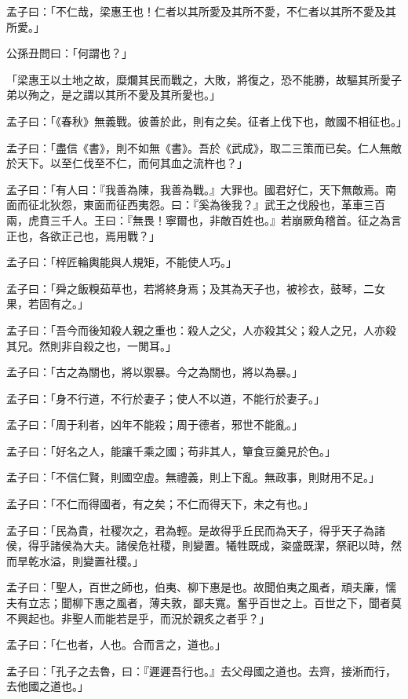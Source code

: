 
\begin{pinyinscope}
孟子曰：「不仁哉，梁惠王也！仁者以其所愛及其所不愛，不仁者以其所不愛及其所愛。」

公孫丑問曰：「何謂也？」

「梁惠王以土地之故，糜爛其民而戰之，大敗，將復之，恐不能勝，故驅其所愛子弟以殉之，是之謂以其所不愛及其所愛也。」

孟子曰：「《春秋》無義戰。彼善於此，則有之矣。征者上伐下也，敵國不相征也。」

孟子曰：「盡信《書》，則不如無《書》。吾於《武成》，取二三策而已矣。仁人無敵於天下。以至仁伐至不仁，而何其血之流杵也？」

孟子曰：「有人曰：『我善為陳，我善為戰。』大罪也。國君好仁，天下無敵焉。南面而征北狄怨，東面而征西夷怨。曰：『奚為後我？』武王之伐殷也，革車三百兩，虎賁三千人。王曰：『無畏！寧爾也，非敵百姓也。』若崩厥角稽首。征之為言正也，各欲正己也，焉用戰？」

孟子曰：「梓匠輪輿能與人規矩，不能使人巧。」

孟子曰：「舜之飯糗茹草也，若將終身焉；及其為天子也，被袗衣，鼓琴，二女果，若固有之。」

孟子曰：「吾今而後知殺人親之重也：殺人之父，人亦殺其父；殺人之兄，人亦殺其兄。然則非自殺之也，一閒耳。」

孟子曰：「古之為關也，將以禦暴。今之為關也，將以為暴。」

孟子曰：「身不行道，不行於妻子；使人不以道，不能行於妻子。」

孟子曰：「周于利者，凶年不能殺；周于德者，邪世不能亂。」

孟子曰：「好名之人，能讓千乘之國；苟非其人，簞食豆羹見於色。」

孟子曰：「不信仁賢，則國空虛。無禮義，則上下亂。無政事，則財用不足。」

孟子曰：「不仁而得國者，有之矣；不仁而得天下，未之有也。」

孟子曰：「民為貴，社稷次之，君為輕。是故得乎丘民而為天子，得乎天子為諸侯，得乎諸侯為大夫。諸侯危社稷，則變置。犧牲既成，粢盛既潔，祭祀以時，然而旱乾水溢，則變置社稷。」

孟子曰：「聖人，百世之師也，伯夷、柳下惠是也。故聞伯夷之風者，頑夫廉，懦夫有立志；聞柳下惠之風者，薄夫敦，鄙夫寬。奮乎百世之上。百世之下，聞者莫不興起也。非聖人而能若是乎，而況於親炙之者乎？」

孟子曰：「仁也者，人也。合而言之，道也。」

孟子曰：「孔子之去魯，曰：『遲遲吾行也。』去父母國之道也。去齊，接淅而行，去他國之道也。」


\end{pinyinscope}
